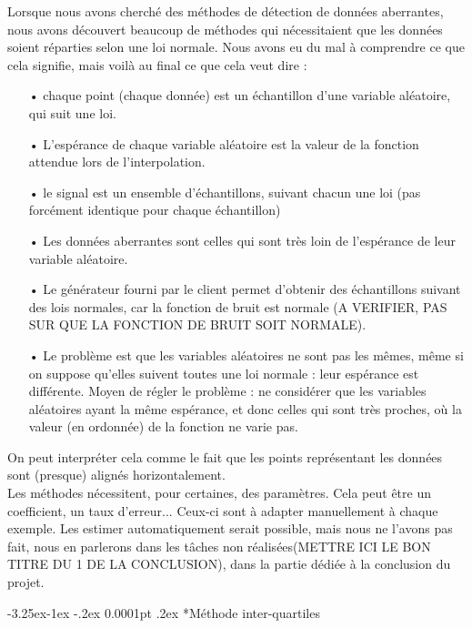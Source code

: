 \documentclass[a4paper,12pt]{article} %
\makeatletter
\renewcommand\subparagraph{\@startsection{subparagraph}{5}{\z@}%
                                      {-3.25ex\@plus -1ex \@minus -.2ex}%
                                      {0.0001pt \@plus .2ex}%
                                      {\normalfont\normalsize\bfseries}}
\makeatother
\begin{document}
    				Lorsque nous avons cherché des méthodes de détection de données aberrantes, nous avons découvert beaucoup de méthodes qui nécessitaient que les données soient réparties selon une loi normale. Nous avons eu du mal à comprendre ce que cela signifie, mais voilà au final ce que cela veut dire :
                    \begin{itemize}
                    \item[•] chaque point (chaque donnée) est un échantillon d'une variable aléatoire, qui suit une loi. 
                    \item[•] L'espérance de chaque variable aléatoire est la valeur de la fonction attendue lors de l'interpolation.
                    \item[•] le signal est un ensemble d'échantillons, suivant chacun une loi (pas forcément identique pour chaque échantillon)
                    \item[•] Les données aberrantes sont celles qui sont très loin de l'espérance de leur variable aléatoire.
                    \item[•] Le générateur fourni par le client permet d'obtenir des échantillons suivant des lois normales, car la fonction de bruit est normale (A VERIFIER, PAS SUR QUE LA FONCTION DE BRUIT SOIT NORMALE).
                    \item[•] Le problème est que les variables aléatoires ne sont pas les mêmes, même si on suppose qu'elles suivent toutes une loi normale : leur espérance est différente. Moyen de régler le problème : ne considérer que les variables aléatoires ayant la même espérance, et donc celles qui sont très proches, où la valeur (en ordonnée) de la fonction ne varie pas.
                    \end{itemize}

    				On peut interpréter cela comme le fait que les points représentant les données sont (presque) alignés horizontalement.\\
    				
                    Les méthodes nécessitent, pour certaines, des paramètres. Cela peut être un coefficient, un taux d'erreur... Ceux-ci sont à adapter manuellement à chaque exemple. Les estimer automatiquement serait possible, mais nous ne l'avons pas fait, nous en parlerons dans les tâches non réalisées(METTRE ICI LE BON TITRE DU 1 DE LA CONCLUSION), dans la partie dédiée à la conclusion du projet.
                    
					\subparagraph*{Méthode inter-quartiles}
                        					
\end{document}
